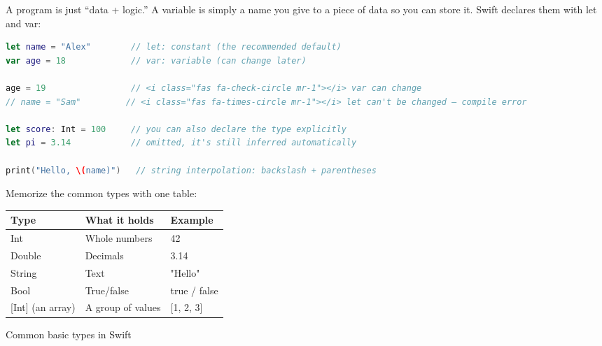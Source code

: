 


A program is just “data + logic.” A variable is simply a name you give to a piece of data so you can store it. Swift declares them with let and var:

\begin{lstlisting}[language=Swift]
let name = "Alex"        // let: constant (the recommended default)
var age = 18             // var: variable (can change later)

age = 19                 // <i class="fas fa-check-circle mr-1"></i> var can change
// name = "Sam"         // <i class="fas fa-times-circle mr-1"></i> let can't be changed — compile error

let score: Int = 100     // you can also declare the type explicitly
let pi = 3.14            // omitted, it's still inferred automatically

print("Hello, \(name)")   // string interpolation: backslash + parentheses
\end{lstlisting}

Memorize the common types with one table:

\begin{center}
\begin{tabularx}{\linewidth}{|X|X|X|}
\hline
\textbf{Type} & \textbf{What it holds} & \textbf{Example} \tabularnewline
\hline
Int & Whole numbers & 42 \tabularnewline
Double & Decimals & 3.14 \tabularnewline
String & Text & "Hello" \tabularnewline
Bool & True/false & true / false \tabularnewline
{}[Int] (an array) & A group of values & {}[1, 2, 3] \tabularnewline
\hline
\end{tabularx}
\end{center}

\begin{center}\small\color{gray}Common basic types in Swift\end{center}

